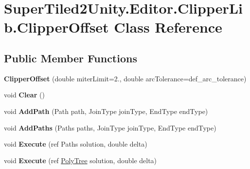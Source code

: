 \hypertarget{class_super_tiled2_unity_1_1_editor_1_1_clipper_lib_1_1_clipper_offset}{}\section{Super\+Tiled2\+Unity.\+Editor.\+Clipper\+Lib.\+Clipper\+Offset Class Reference}
\label{class_super_tiled2_unity_1_1_editor_1_1_clipper_lib_1_1_clipper_offset}
\subsection*{Public Member Functions}
\begin{DoxyCompactItemize}
\item 
\mbox{\label{class_super_tiled2_unity_1_1_editor_1_1_clipper_lib_1_1_clipper_offset_a9a7c2114cb5864499cd7292dcf11df67}} 
{\bfseries Clipper\+Offset} (double miter\+Limit=2., double arc\+Tolerance=def\+\_\+arc\+\_\+tolerance)
\item 
\mbox{\label{class_super_tiled2_unity_1_1_editor_1_1_clipper_lib_1_1_clipper_offset_aed766c521dd63a024c07e1f1a719ae57}} 
void {\bfseries Clear} ()
\item 
\mbox{\label{class_super_tiled2_unity_1_1_editor_1_1_clipper_lib_1_1_clipper_offset_ab36e9f58ffc0c61b4c90917f463b9f09}} 
void {\bfseries Add\+Path} (Path path, Join\+Type join\+Type, End\+Type end\+Type)
\item 
\mbox{\label{class_super_tiled2_unity_1_1_editor_1_1_clipper_lib_1_1_clipper_offset_ab890d9b52d89250b3728419c8fac1efa}} 
void {\bfseries Add\+Paths} (Paths paths, Join\+Type join\+Type, End\+Type end\+Type)
\item 
\mbox{\label{class_super_tiled2_unity_1_1_editor_1_1_clipper_lib_1_1_clipper_offset_a1ee4c96219da1d001bb3a46e0816e9ea}} 
void {\bfseries Execute} (ref Paths solution, double delta)
\item 
\mbox{\label{class_super_tiled2_unity_1_1_editor_1_1_clipper_lib_1_1_clipper_offset_aaa598ebc2fd165fccdefe5710e55a5c5}} 
void {\bfseries Execute} (ref \mbox{\hyperlink{class_super_tiled2_unity_1_1_editor_1_1_clipper_lib_1_1_poly_tree}{Poly\+Tree}} solution, double delta)
\end{DoxyCompactItemize}
